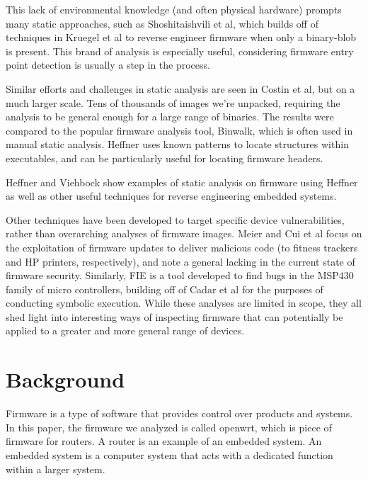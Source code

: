 \documentclass[letterpaper,twocolumn,10pt]{article}
\begin{document}
This lack of environmental knowledge (and often physical hardware) prompts many static approaches, such as Shoshitaishvili et al\cite{firmalice2015}, which builds off of techniques in Kruegel et al\cite{staticdisassembly2002} to reverse engineer firmware when only a binary-blob is present. This brand of analysis is especially useful, considering firmware entry point detection is usually a step in the process. 

Similar efforts and challenges in static analysis are seen in Costin et al\cite{analysisofembeddedfirmware2014}, but on a much larger scale. Tens of thousands of images we’re unpacked, requiring the analysis to be general enough for a large range of binaries. The results were compared to the popular firmware analysis tool, Binwalk\cite{binwalk}, which is often used in manual static analysis. Heffner\cite{binwalk} uses known patterns to locate structures within executables, and can be particularly useful for locating firmware headers.

Heffner\cite{wrt120N2014} and Viehbock\cite{braindump2011} show examples of static analysis on firmware using Heffner\cite{binwalk} as well as other useful techniques for reverse engineering embedded systems.

Other techniques have been developed to target specific device vulnerabilities, rather than overarching analyses of firmware images. Meier\cite{fitnesstrackers2016} and Cui et al\cite{firmwaremodsattack} focus on the exploitation of firmware updates to deliver malicious code (to fitness trackers and HP printers, respectively), and note a general lacking in the current state of firmware security. Similarly, FIE\cite{fie2013} is a tool developed to find bugs in the MSP430 family of micro controllers, building off of Cadar et al\cite{klee2008} for the purposes of conducting symbolic execution. While these analyses are limited in scope, they all shed light into interesting ways of inspecting firmware that can potentially be applied to a greater and more general range of devices. 

\section{Background}
Firmware is a type of software that provides control over products and systems. In this paper, the firmware we analyzed is called openwrt, which is piece of firmware for routers. A router is an example of an embedded system. An embedded system is a computer system that acts with a dedicated function within a larger system.               
\end{document}
